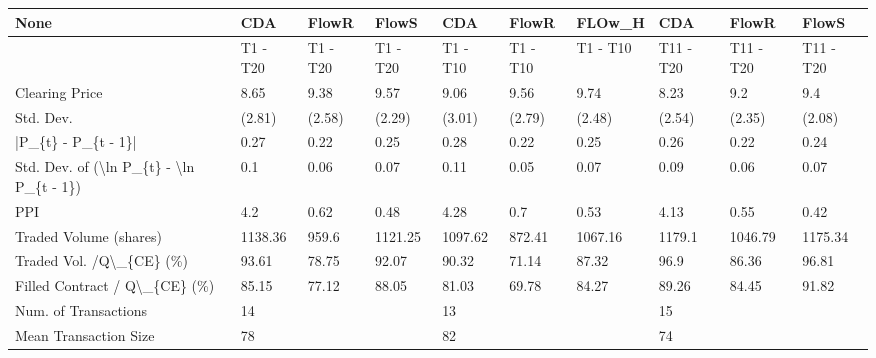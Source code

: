 \begin{tabular}{llllllllll}
\hline
 None                                                      & CDA      & FlowR    & FlowS    & CDA      & FlowR    & FLOw\_H   & CDA       & FlowR     & FlowS     \\
\hline
                                                           & T1 - T20 & T1 - T20 & T1 - T20 & T1 - T10 & T1 - T10 & T1 - T10 & T11 - T20 & T11 - T20 & T11 - T20 \\
 Clearing Price                                            & 8.65     & 9.38     & 9.57     & 9.06     & 9.56     & 9.74     & 8.23      & 9.2       & 9.4       \\
 Std. Dev.                                                 & (2.81)   & (2.58)   & (2.29)   & (3.01)   & (2.79)   & (2.48)   & (2.54)    & (2.35)    & (2.08)    \\
 |P\_\{t\} - P\_\{t - 1\}|                                       & 0.27     & 0.22     & 0.25     & 0.28     & 0.22     & 0.25     & 0.26      & 0.22      & 0.24      \\
 Std. Dev. of (\textbackslash{}ln P\_\{t\} - \textbackslash{}ln P\_\{t - 1\})                  & 0.1      & 0.06     & 0.07     & 0.11     & 0.05     & 0.07     & 0.09      & 0.06      & 0.07      \\
 PPI                                                       & 4.2      & 0.62     & 0.48     & 4.28     & 0.7      & 0.53     & 4.13      & 0.55      & 0.42      \\
 Traded Volume (shares)                                    & 1138.36  & 959.6    & 1121.25  & 1097.62  & 872.41   & 1067.16  & 1179.1    & 1046.79   & 1175.34   \\
 Traded Vol. /Q\textbackslash{}\_\{CE\} (\%)                                  & 93.61    & 78.75    & 92.07    & 90.32    & 71.14    & 87.32    & 96.9      & 86.36     & 96.81     \\
 Filled Contract / Q\textbackslash{}\_\{CE\} (\%)                             & 85.15    & 77.12    & 88.05    & 81.03    & 69.78    & 84.27    & 89.26     & 84.45     & 91.82     \\
 Num. of Transactions                                      & 14       &          &          & 13       &          &          & 15        &           &           \\
 Mean Transaction Size                                     & 78       &          &          & 82       &          &          & 74        &           &           \\

\end{tabular}
